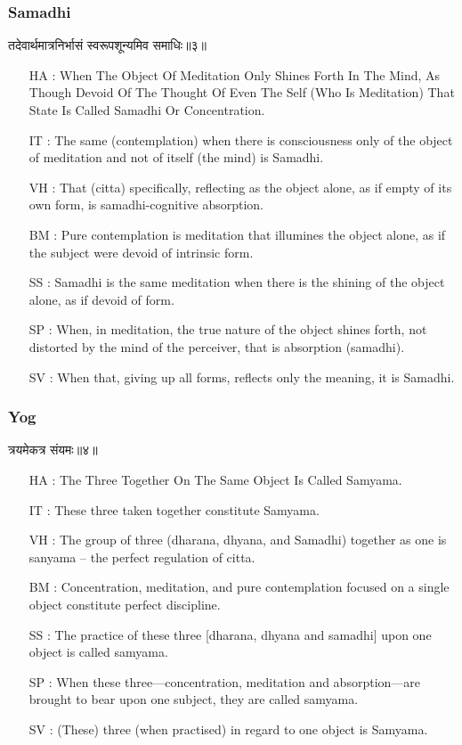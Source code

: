 \begin{frame}[fragile]\frametitle{Samadhi}
\begin{sanskrit}
तदेवार्थमात्रनिर्भासं स्वरूपशून्यमिव समाधिः॥३॥
\end{sanskrit}

	\begin{itemize}
	\item [HA]: When The Object Of Meditation Only Shines Forth In The Mind, As Though Devoid Of The Thought Of Even The Self (Who Is Meditation) That State Is Called Samadhi Or Concentration.
	\item [IT]: The same (contemplation) when there is consciousness only of the object of meditation and not of itself (the mind) is Samadhi.
	\item [VH]: That (citta) specifically, reflecting as the object alone, as if empty of its own form, is samadhi-cognitive absorption.
	\item [BM]: Pure contemplation is meditation that illumines the object alone, as if the subject were devoid of intrinsic form.
	\item [SS]: Samadhi is the same meditation when there is the shining of the object alone, as if devoid of form.
	\item [SP]: When, in meditation, the true nature of the object shines forth, not distorted by the mind of the perceiver, that is absorption (samadhi).
	\item [SV]: When that, giving up all forms, reflects only the meaning, it is Samadhi. 
	\end{itemize}
\end{frame}


\begin{frame}[fragile]\frametitle{Yog}
\begin{sanskrit}
त्रयमेकत्र संयमः॥४॥
\end{sanskrit}

	\begin{itemize}
	\item [HA]: The Three Together On The Same Object Is Called Samyama.
	\item [IT]: These three taken together constitute Samyama.
	\item [VH]: The group of three (dharana, dhyana, and Samadhi) together as one is sanyama – the perfect regulation of citta.
	\item [BM]: Concentration, meditation, and pure contemplation focused on a single object constitute perfect discipline.
	\item [SS]: The practice of these three [dharana, dhyana and samadhi] upon one object is called samyama.
	\item [SP]: When these three—concentration, meditation and absorption—are brought to bear upon one subject, they are called samyama.
	\item [SV]: (These) three (when practised) in regard to one object is Samyama. 
	\end{itemize}
\end{frame}


